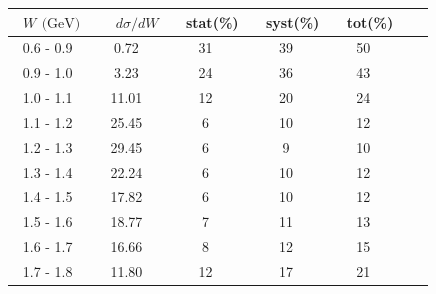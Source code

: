 \documentclass[aps, prd, reprint,showpacs,  preprintnumbers,amsmath,amssymb,superscriptaddress, nofootinbib]{revtex4-1}
\makeatletter
\renewenvironment{table}
  {\def\@captype{table}}
  {}
\makeatother
\begin{document}

\begin{table}
\centering
\begin{tabular}{ccccccc}
\hline
~$W$ $\text{(GeV)}$ &~~ $d\sigma/dW$ &~ stat(\%) &~ syst(\%) &~ tot(\%)  \\
\hline
     0.6 - 0.9 &   0.72 &   31 &   39 &   50 \\
     0.9 - 1.0 &   3.23 &   24 &   36 &   43 \\
     1.0 - 1.1 &  11.01 &   12 &   20 &   24 \\
     1.1 - 1.2 &  25.45 &    6 &   10 &   12 \\
     1.2 - 1.3 &  29.45 &    6 &    9 &   10 \\
     1.3 - 1.4 &  22.24 &    6 &   10 &   12 \\
     1.4 - 1.5 &  17.82 &    6 &   10 &   12 \\
     1.5 - 1.6 &  18.77 &    7 &   11 &   13 \\
     1.6 - 1.7 &  16.66 &    8 &   12 &   15 \\
     1.7 - 1.8 &  11.80 &   12 &   17 &   21 \\
\hline\hline
\end{tabular}
\caption{ Flux-averaged differential cross section in $W$, 
$d\sigma/dW (10^{-40}\text{cm}^2/\text{nucleon}/(\text{GeV}))$, 
for $\pi^0$+nucleon(s) production with statistical (stat), systematic (syst), and total (tot) uncertainties.}
\label{tb:piz-W}
\end{table}
\smallskip
\smallskip
\smallskip
\smallskip
\smallskip
\smallskip
\smallskip
\smallskip
\smallskip
\smallskip
\end{document}
